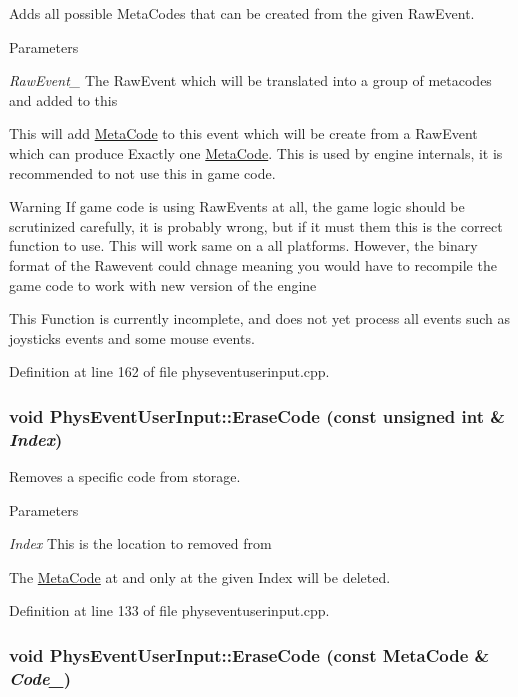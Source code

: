 Adds all possible MetaCodes that can be created from the given RawEvent. 
\begin{DoxyParams}{Parameters}
\item[{\em RawEvent\_\-}]The RawEvent which will be translated into a group of metacodes and added to this\end{DoxyParams}
This will add \hyperlink{classMetaCode}{MetaCode} to this event which will be create from a RawEvent which can produce Exactly one \hyperlink{classMetaCode}{MetaCode}. This is used by engine internals, it is recommended to not use this in game code. \begin{DoxyWarning}{Warning}
If game code is using RawEvents at all, the game logic should be scrutinized carefully, it is probably wrong, but if it must them this is the correct function to use. This will work same on a all platforms. However, the binary format of the Rawevent could chnage meaning you would have to recompile the game code to work with new version of the engine \par
 This Function is currently incomplete, and does not yet process all events such as joysticks events and some mouse events. 
\end{DoxyWarning}


Definition at line 162 of file physeventuserinput.cpp.\hypertarget{classPhysEventUserInput_a8cbbee3c2be3bd12746ad442fce526e4}{
\subsubsection[{EraseCode}]{\setlength{\rightskip}{0pt plus 5cm}void PhysEventUserInput::EraseCode (const unsigned int \& {\em Index})}}
\label{dc/d0e/classPhysEventUserInput_a8cbbee3c2be3bd12746ad442fce526e4}


Removes a specific code from storage. 
\begin{DoxyParams}{Parameters}
\item[{\em Index}]This is the location to removed from\end{DoxyParams}
The \hyperlink{classMetaCode}{MetaCode} at and only at the given Index will be deleted. 

Definition at line 133 of file physeventuserinput.cpp.\hypertarget{classPhysEventUserInput_a1dbd2996770df334fba9f67d9bb4ffa0}{
\subsubsection[{EraseCode}]{\setlength{\rightskip}{0pt plus 5cm}void PhysEventUserInput::EraseCode (const {\bf MetaCode} \& {\em Code\_\-})}}
\label{dc/d0e/classPhysEventUserInput_a1dbd2996770df334fba9f67d9bb4ffa0}


